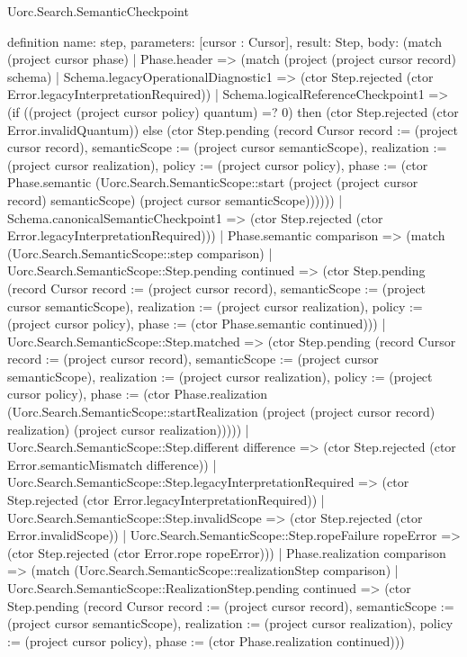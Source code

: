 \begin{lexlean}{Uorc.Search.SemanticCheckpoint}
\begin{semanticmodule}
definition{
  name: step,
  parameters: [cursor : Cursor],
  result: Step,
  body: (match (project cursor phase)
    | Phase.header => (match (project (project cursor record) schema)
      | Schema.legacyOperationalDiagnostic1 => (ctor Step.rejected (ctor Error.legacyInterpretationRequired))
      | Schema.logicalReferenceCheckpoint1 => (if ((project (project cursor policy) quantum) =? 0) then (ctor Step.rejected (ctor Error.invalidQuantum)) else (ctor Step.pending (record Cursor {record := (project cursor record), semanticScope := (project cursor semanticScope), realization := (project cursor realization), policy := (project cursor policy), phase := (ctor Phase.semantic (Uorc.Search.SemanticScope::start (project (project cursor record) semanticScope) (project cursor semanticScope)))})))
      | Schema.canonicalSemanticCheckpoint1 => (ctor Step.rejected (ctor Error.legacyInterpretationRequired)))
    | Phase.semantic comparison => (match (Uorc.Search.SemanticScope::step comparison)
      | Uorc.Search.SemanticScope::Step.pending continued => (ctor Step.pending (record Cursor {record := (project cursor record), semanticScope := (project cursor semanticScope), realization := (project cursor realization), policy := (project cursor policy), phase := (ctor Phase.semantic continued)}))
      | Uorc.Search.SemanticScope::Step.matched => (ctor Step.pending (record Cursor {record := (project cursor record), semanticScope := (project cursor semanticScope), realization := (project cursor realization), policy := (project cursor policy), phase := (ctor Phase.realization (Uorc.Search.SemanticScope::startRealization (project (project cursor record) realization) (project cursor realization)))}))
      | Uorc.Search.SemanticScope::Step.different difference => (ctor Step.rejected (ctor Error.semanticMismatch difference))
      | Uorc.Search.SemanticScope::Step.legacyInterpretationRequired => (ctor Step.rejected (ctor Error.legacyInterpretationRequired))
      | Uorc.Search.SemanticScope::Step.invalidScope => (ctor Step.rejected (ctor Error.invalidScope))
      | Uorc.Search.SemanticScope::Step.ropeFailure ropeError => (ctor Step.rejected (ctor Error.rope ropeError)))
    | Phase.realization comparison => (match (Uorc.Search.SemanticScope::realizationStep comparison)
      | Uorc.Search.SemanticScope::RealizationStep.pending continued => (ctor Step.pending (record Cursor {record := (project cursor record), semanticScope := (project cursor semanticScope), realization := (project cursor realization), policy := (project cursor policy), phase := (ctor Phase.realization continued)}))
}
\end{semanticmodule}
\end{lexlean}
